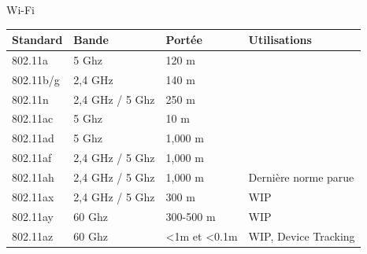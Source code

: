 \documentclass[aspectratio=169]{beamer}
\begin{document}
\begin{frame}{Wi-Fi}
    
\begin{table}[]
\begin{tabular}{|l|l|l|l|}
\hline
\textbf{Standard} & \textbf{Bande}  & \textbf{Portée}                  & \textbf{Utilisations} \\ \hline
802.11a           & 5 Ghz           & 120 m                            &                       \\ \hline
802.11b/g         & 2,4 GHz         & 140 m                            &                       \\ \hline
802.11n           & 2,4 GHz / 5 Ghz & 250 m                            &                       \\ \hline
802.11ac          & 5 Ghz           & 10 m                             &                       \\ \hline
802.11ad          & 5 Ghz           & 1,000 m                          &                       \\ \hline
802.11af          & 2,4 GHz / 5 Ghz & 1,000 m                          &                       \\ \hline
802.11ah          & 2,4 GHz / 5 Ghz & 1,000 m                          & Dernière norme parue  \\ \hline
802.11ax          & 2,4 GHz / 5 Ghz & 300 m                            & WIP                   \\ \hline
802.11ay          & 60 Ghz          & 300-500 m                        & WIP                   \\ \hline
802.11az          & 60 Ghz          & \textless{}1m et \textless{}0.1m & WIP, Device Tracking  \\ \hline
\end{tabular}
\end{table}

\end{frame}
\end{document}
